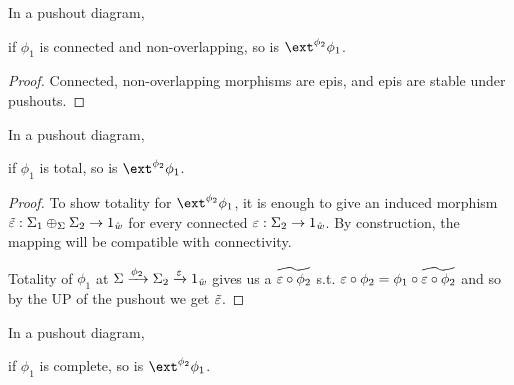 \begin{lemma}\label{lem:epi-pushout}
    In a pushout diagram, 
    if $\phi_1$ is connected and non-overlapping, so is $\ext^{\phi_2}\phi_1$.
\end{lemma}
\begin{proof}
    Connected, non-overlapping morphisms are epis, and epis are stable under pushouts.
\end{proof}

\begin{lemma}\label{lem:total-pushout}
    In a pushout diagram, 
    if $\phi_1$ is total, so is $\ext^{\phi_2}\phi_1$.
\end{lemma}
\begin{proof}
    To show totality for $\ext^{\phi_2}\phi_1$, it is enough to give an induced morphism $\tilde{\varepsilon} : \Sigma_1 \oplus_{\Sigma} \Sigma_2 \to 1_{\hat{\mathit{w}}}$
    for every connected $\varepsilon : \Sigma_2 \to 1_{\hat{\mathit{w}}}$.
    By construction, the mapping will be compatible with connectivity.

    Totality of $\phi_1$ at $\Sigma \xrightarrow{\phi_2} \Sigma_2 \xrightarrow{\varepsilon} 1_{\hat{\mathit{w}}}$ gives us a $\widetilde{\varepsilon \circ \phi_2}$ s.t.
    $\varepsilon \circ \phi_2 = \phi_1 \circ \widetilde{\varepsilon \circ \phi_2}$ and so by the UP of the pushout we get $\tilde{\varepsilon}$.
\end{proof}

\begin{corollary}\label{lem:compl-pushout}
    In a pushout diagram, 
    if $\phi_1$ is complete, so is $\ext^{\phi_2}\phi_1$.
\end{corollary}
